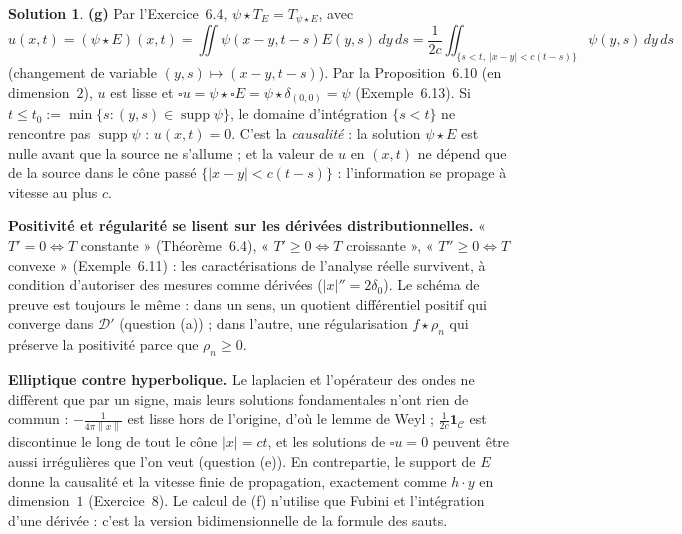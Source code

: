 \documentclass[11pt,a4paper]{article}
\newcommand{\norm}[1]{\left\|#1\right\|}
\DeclareMathOperator{\supp}{supp}
\newcommand{\D}{\mathcal{D}}
\theoremstyle{definition}
\newtheorem*{solution}{Solution}
\begin{document}
\begin{solution}
\medskip
\noindent\textbf{(g)} Par l'Exercice~6.4, $\psi\star T_E=T_{\psi\star E}$, avec
\[
u(x,t)=(\psi\star E)(x,t)=\iint\psi(x-y,t-s)E(y,s)\,dy\,ds=\frac1{2c}\iint_{\{s<t,\ |x-y|<c(t-s)\}}\psi(y,s)\,dy\,ds
\]
(changement de variable $(y,s)\mapsto(x-y,t-s)$). Par la Proposition~6.10 (en dimension~$2$), $u$ est lisse et $\square u=\psi\star\square E=\psi\star\delta_{(0,0)}=\psi$ (Exemple~6.13). Si $t\le t_0:=\min\{s:(y,s)\in\supp\psi\}$, le domaine d'intégration $\{s<t\}$ ne rencontre pas $\supp\psi$ : $u(x,t)=0$. C'est la \emph{causalité} : la solution $\psi\star E$ est nulle avant que la source ne s'allume ; et la valeur de $u$ en $(x,t)$ ne dépend que de la source dans le cône passé $\{|x-y|<c(t-s)\}$ : l'information se propage à vitesse au plus $c$.
\end{solution}

\begin{pointcle}
\textbf{Positivité et régularité se lisent sur les dérivées distributionnelles.} « $T'=0\iff T$ constante » (Théorème~6.4), « $T'\ge0\iff T$ croissante », « $T''\ge0\iff T$ convexe » (Exemple~6.11) : les caractérisations de l'analyse réelle survivent, à condition d'autoriser des mesures comme dérivées ($|x|''=2\delta_0$). Le schéma de preuve est toujours le même : dans un sens, un quotient différentiel positif qui converge dans $\D'$ (question (a)) ; dans l'autre, une régularisation $f\star\rho_n$ qui préserve la positivité parce que $\rho_n\ge0$.
\end{pointcle}

\begin{commentaire}
\textbf{Elliptique contre hyperbolique.} Le laplacien et l'opérateur des ondes ne diffèrent que par un signe, mais leurs solutions fondamentales n'ont rien de commun : $-\frac1{4\pi\norm x}$ est lisse hors de l'origine, d'où le lemme de Weyl ; $\frac1{2c}\mathbf 1_{\mathcal C}$ est discontinue le long de tout le cône $|x|=ct$, et les solutions de $\square u=0$ peuvent être aussi irrégulières que l'on veut (question (e)). En contrepartie, le support de $E$ donne la causalité et la vitesse finie de propagation, exactement comme $h\cdot y$ en dimension~$1$ (Exercice~8). Le calcul de (f) n'utilise que Fubini et l'intégration d'une dérivée : c'est la version bidimensionnelle de la formule des sauts.
\end{commentaire}
\end{document}
